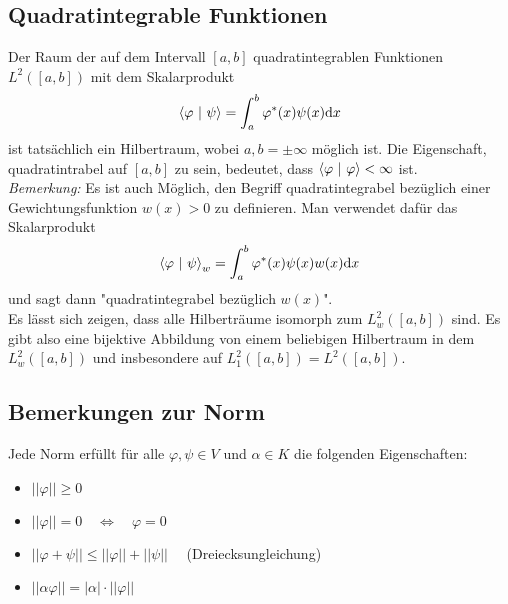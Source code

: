 \documentclass[a4paper,12pt,portrait]{book}
\numberwithin{equation}{section}
\begin{document}
\subsection{Quadratintegrable Funktionen}
Der Raum der auf dem Intervall $[a,b]$ quadratintegrablen Funktionen $L^2([a,b])$ mit dem Skalarprodukt
\begin{equation*}
\left\langle \varphi \ \middle| \ \psi\right\rangle = \int_a^b \varphi^* (x)\psi(x)\mathrm{d}x
\end{equation*}
ist tatsächlich ein Hilbertraum, wobei $a,b=\pm\infty$ möglich ist. Die Eigenschaft, quadratintrabel auf $[a,b]$ zu sein, bedeutet, dass $\left\langle \varphi \ \middle| \ \varphi\right\rangle<\infty$ ist.\\

\emph{Bemerkung:} Es ist auch Möglich, den Begriff quadratintegrabel bezüglich einer Gewichtungsfunktion $w(x)>0$ zu definieren. Man verwendet dafür das Skalarprodukt
\begin{equation*}
\left\langle \varphi \ \middle| \ \psi\right\rangle_w = \int_a^b\varphi^*(x)\psi(x)w(x)\mathrm{d}x
\end{equation*}
und sagt dann "quadratintegrabel bezüglich $w(x)$". \\

Es lässt sich zeigen, dass alle Hilberträume isomorph zum $L_w^2([a,b])$ sind. Es gibt also eine bijektive Abbildung von einem beliebigen Hilbertraum in dem $L_w^2([a,b])$ und insbesondere auf $L_1^2([a,b])=L^2([a,b])$.
\newpage
\subsection{Bemerkungen zur Norm}

Jede Norm erfüllt für alle $\varphi,\psi\in V$ und $\alpha\in K$ die folgenden Eigenschaften:

\begin{itemize}
	\item $||\varphi|| \geq 0$
	\item $||\varphi|| = 0 \quad\Leftrightarrow\quad \varphi = 0$
	\item $||\varphi + \psi|| \leq ||\varphi|| + ||\psi||\quad$ (Dreiecksungleichung)
	\item $||\alpha\varphi||=|\alpha|\cdot||\varphi||$
\end{itemize}
\end{document}
